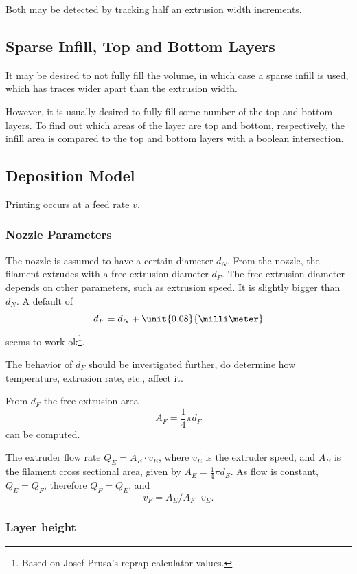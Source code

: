 \documentclass[12pt,a4paper,oneside,openany]{article}
\begin{document}
Both may be detected by tracking half an extrusion width increments. 


\subsection{Sparse Infill, Top and Bottom Layers}

It may be desired to not fully fill the volume, in which case a sparse infill is used, which has traces wider apart than the extrusion width.

However, it is usually desired to fully fill some number of the top and bottom layers. To find out which areas of the layer are top and bottom, respectively, the infill area is compared to the top and bottom layers with a boolean intersection. 

\subsection {Deposition Model}

Printing occurs at a feed rate $v$.

\subsubsection {Nozzle Parameters}

The nozzle is assumed to have a certain diameter $d_N$. From the nozzle, the filament extrudes with a free extrusion diameter $d_F$. The free extrusion diameter depends on other parameters, such as extrusion speed. It is slightly bigger than $d_N$. A default of $$d_F = d_N + \unit{0.08}{\milli\meter}$$ seems to work ok\footnote{Based on Josef Prusa's reprap calculator values.}.

The behavior of $d_F$ should be investigated further, do determine how temperature, extrusion rate, etc., affect it.

From $d_F$ the free extrusion area $$A_F = \frac{1}{4}\pi d_F$$ can be computed.

The extruder flow rate $Q_E = A_E \cdot v_E$, where $v_E$ is the extruder speed, and $A_E$ is the filament cross sectional area, given by $A_E = \frac{1}{4}\pi d_E$. As flow is constant, $Q_E = Q_F$, therefore $Q_F = Q_E$, and $$v_F = A_E / A_F \cdot v_E.$$

\subsubsection {Layer height}
\end{document}
